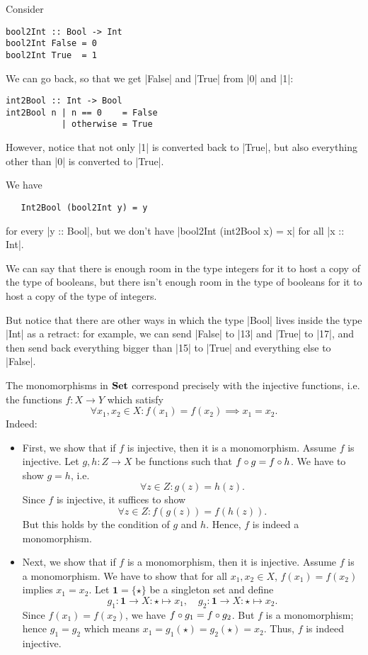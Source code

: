 \begin{solution}\label{sol:section-retraction-bool-int}
Consider
\begin{lstlisting}
bool2Int :: Bool -> Int
bool2Int False = 0
bool2Int True  = 1
\end{lstlisting}    

We can go back, so that we get |False| and |True| from |0| and |1|:
\begin{lstlisting}
int2Bool :: Int -> Bool
int2Bool n | n == 0    = False
           | otherwise = True
\end{lstlisting}
However, notice that not only |1| is converted back to |True|, but also everything other than |0| is converted to |True|.

We have
\begin{lstlisting}
   Int2Bool (bool2Int y) = y
\end{lstlisting}
for every |y :: Bool|, but we don't have |bool2Int (int2Bool x) = x| for all |x :: Int|.

We can say that there is enough room in the type integers for it to host a copy of the type of booleans, but there isn't enough room in the type of booleans for it to host a copy of the type of integers.

But notice that there are other ways in which the type |Bool| lives inside the type |Int| as a retract: for example, we can send |False| to |13| and |True| to |17|, and then send back everything bigger than |15| to |True| and everything else to |False|.
\end{solution}




\begin{solution}\label{sol:mono-inj}
The monomorphisms in $\SET$ correspond precisely with the injective functions, i.e. the functions $f:X\to Y$ which satisfy
\[
\forall x_1,x_2\in X: f(x_1)=f(x_2) \implies x_1=x_2.
\]
Indeed:
\begin{itemize}
\item First, we show that if $f$ is injective, then it is a monomorphism. Assume $f$ is injective. Let $g,h: Z\to X$ be functions such that $\co{g}{f}=\co{h}{f}$. We have to show $g=h$, i.e. 
\[
\forall z\in Z: g(z)=h(z).
\]
Since $f$ is injective, it suffices to show 
\[
\forall z\in Z: f(g(z))=f(h(z)).
\]
But this holds by the condition of $g$ and $h$. Hence, $f$ is indeed a monomorphism.
\item Next, we show that if $f$ is a monomorphism, then it is injective. Assume $f$ is a monomorphism. We have to show that for all $x_1,x_2\in X$, $f(x_1) = f(x_2)$ implies $x_1 = x_2$. Let $\mathbf{1} = \{\star\}$ be a singleton set and define
\[
g_1 : \mathbf{1}\to X: \star\mapsto x_1,\quad  g_2 : \mathbf{1}\to X: \star\mapsto x_2. 
\]
Since $f(x_1)=f(x_2)$, we have $\co{g_1}{f} = \co{g_2}{f}$. But $f$ is a monomorphism; hence $g_1 = g_2$ which means $x_1 = g_1(\star) = g_2(\star) = x_2$. Thus, $f$ is indeed injective.
\end{itemize}
\end{solution}

